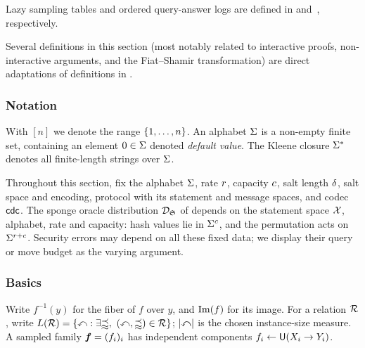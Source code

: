
Lazy sampling tables and ordered query-answer logs are defined in  and~, respectively.

Several definitions in this section (most notably related to interactive proofs, non-interactive arguments, and the Fiat--Shamir transformation) are direct adaptations of definitions in \cite{snarg-book}.

\subsubsection{Notation}
\label{sec:dsfs_notation}

With \([n]\) we denote the range \(\left\{1, \dots, n\right\}\).
An alphabet \(\Sigma\) is a non-empty finite set, containing an element \(0 \in \Sigma\) denoted \emph{default value}. The Kleene closure \(\Sigma^{*}\) denotes all finite-length strings over \(\Sigma\).

Throughout this section, fix the alphabet \(\Sigma\), rate \(r\), capacity \(c\), salt length \(\delta\), salt space and encoding, protocol with its statement and message spaces, and codec \(\mathsf{cdc}\). The sponge oracle distribution \(\mathcal{D}_{\mathfrak S}\) of  depends on the statement space \(\mathcal X\), alphabet, rate and capacity: hash values lie in \(\Sigma^{c}\), and the permutation acts on \(\Sigma^{r+c}\). Security errors may depend on all these fixed data; we display their query or move budget as the varying argument.

\subsubsection{Basics}
\label{sec:dsfs_basics}

Write \(f^{-1}(y)\) for the fiber of \(f\) over \(y\), and \(\operatorname{Im}(f)\) for its image. For a relation \(\mathcal{R}\), write \(\RelationLanguage{\Relation}=\{\Instance:\exists\WitnessValue,\ (\Instance,\WitnessValue)\in\Relation\}\); \(|\mathbb{x}|\) is the chosen instance-size measure. A sampled family \(\boldsymbol{f}=(f_i)_i\) has independent components \(f_i\leftarrow\mathsf{U}(X_i\to Y_i)\).


